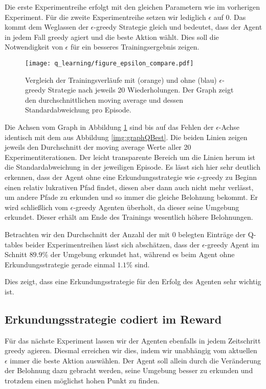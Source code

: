 Die erste Experimentreihe erfolgt mit den gleichen Parametern wie im vorherigen Experiment. Für die zweite Experimentreihe setzen wir lediglich $ \epsilon $ auf 0. Das kommt dem Weglassen der $ \epsilon $-greedy Strategie gleich und bedeutet, dass der Agent in jedem Fall greedy agiert und die beste Aktion wählt. Dies soll die Notwendigkeit von $ \epsilon $ für ein besseres Trainingsergebnis zeigen.
\begin{figure}[H]
    \centering
    \texttt{[image: q\_learning/figure\_epsilon\_compare.pdf]}
    \caption{Vergleich der Trainingsverläufe mit (orange) und ohne (blau) $ \epsilon $-greedy Strategie nach jeweils 20 Wiederholungen. Der Graph zeigt den durchschnittlichen moving average und dessen Standardabweichung pro Episode.} \label{img:graphQEpsComp}
\end{figure}
Die Achsen vom Graph in Abbildung \ref{img:graphQEpsComp} sind bis auf das Fehlen der $ \epsilon $-Achse identisch mit dem aus Abbildung \ref{img:graphQBest}. Die beiden Linien zeigen jeweils den Durchschnitt der moving average Werte aller 20 Experimentiterationen. Der leicht transparente Bereich um die Linien herum ist die Standardabweichung in der jeweiligen Episode.
Es lässt sich hier sehr deutlich erkennen, dass der Agent ohne eine Erkundungsstrategie wie $ \epsilon $-greedy zu Beginn einen relativ lukrativen Pfad findet, diesen aber dann auch nicht mehr verlässt, um andere Pfade zu erkunden und so immer die gleiche Belohnung bekommt. Er wird schließlich vom $ \epsilon $-greedy Agenten überholt, da dieser seine Umgebung erkundet. Dieser erhält am Ende des Trainings wesentlich höhere Belohnungen.

Betrachten wir den Durchschnitt der Anzahl der mit 0 belegten Einträge der Q-tables beider Experimentreihen lässt sich abschätzen, dass der $ \epsilon $-greedy Agent im Schnitt $ 89.9\% $ der Umgebung erkundet hat, während es beim Agent ohne Erkundungsstrategie gerade einmal $ 1.1\% $ sind.

Dies zeigt, dass eine Erkundungsstrategie für den Erfolg des Agenten sehr wichtig ist.

\subsection{Erkundungsstrategie codiert im Reward}
Für das nächste Experiment lassen wir der Agenten ebenfalls in jedem Zeitschritt greedy agieren. Diesmal erreichen wir dies, indem wir unabhängig vom aktuellen $ \epsilon $ immer die beste Aktion auswählen. Der Agent soll allein durch die Veränderung der Belohnung dazu gebracht werden, seine Umgebung besser zu erkunden und trotzdem einen möglichst hohen Punkt zu finden.

